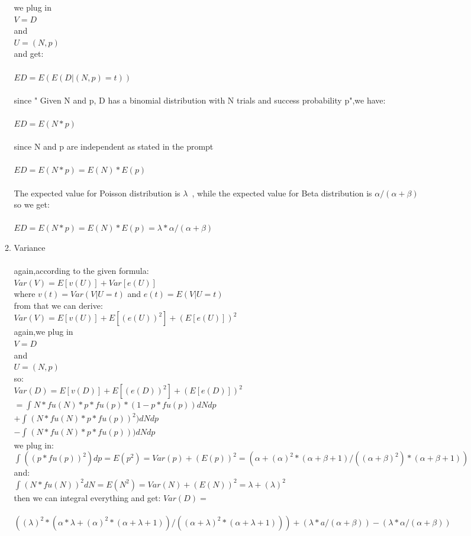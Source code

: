 \documentclass{amsart}
\begin{document}
\begin{enumerate}
\begin{enumerate}
we plug in \\$V = D $\\and \\$U = (N,p)$\\
and get:\\
\\$ED = E(E(D|(N,p)=t))$\\\\
since " Given N and p, D has a binomial distribution with N trials and success probability p",we have:\\
\\$ED = E(N*p)$\\\\
since N and p are independent as stated in the prompt\\
\\$ED = E(N*p)=E(N)*E(p)$\\\\
The expected value for Poisson distribution is $\lambda$\ , while the expected value for Beta distribution is $\alpha / (\alpha + \beta)$\\
so we get:\\
\\$ED = E(N*p)=E(N)*E(p)=\lambda*\alpha / (\alpha + \beta)$
\newpage
\item Variance\\\\
again,according to the given formula:\\
$Var(V) = E[v(U)] + Var[e(U)]$\\
where $v(t) = Var(V | U = t)$ and $e(t) = E(V | U = t) $\\
from that we can derive:\\
$Var(V)= E[v(U)] + E[(e(U))^2] + (E[e(U)])^2$\\
again,we plug in \\$V = D $\\and \\$U = (N,p)$\\
so:\\
$Var(D)= E[v(D)] + E[(e(D))^2] + (E[e(D)])^2$\\
$=\int_{}^{} N *fu(N) * p * fu(p) * (1 - p * fu(p))dNdp$\\
$+\int_{}^{} (N *fu(N) * p * fu(p))^2 )dNdp$\\
$-\int_{}^{} (N *fu(N) * p * fu(p)) )dNdp$\\
we plug in:\\
$\int_{}^{}((p*fu(p))^2)dp = E(p^2) = Var(p) + (E(p))^2 = (\alpha+(\alpha)^2*(\alpha+\beta+1)/((\alpha+\beta)^2)*(\alpha+\beta+1))$\\
and:\\
$\int_{}^{}(N*fu(N))^2dN = E(N^2)=Var(N)+(E(N))^2=\lambda + (\lambda)^2$\\
then we can integral everything and get:
$Var(D)= $\\
\\$((\lambda)^2*(\alpha*\lambda+(\alpha)^2*(\alpha+\lambda+1))/((\alpha+\lambda)^2*(\alpha+\lambda+1)))+(\lambda*a/(\alpha+\beta))-(\lambda*\alpha/(\alpha+\beta))$\\

\end{enumerate}
\end{enumerate}
\end{document}
